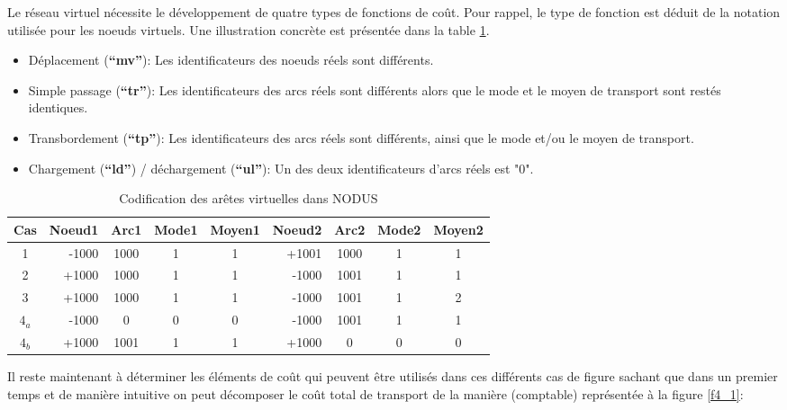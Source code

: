 Le réseau virtuel nécessite le développement de quatre types de fonctions de
coût. Pour rappel, le type de fonction est déduit de la notation utilisée pour
les noeuds virtuels. Une illustration concrète est présentée dans la table
\ref{tab4_1}.

\begin{itemize}
  \item Déplacement (\textbf{``mv''}): Les identificateurs des noeuds réels sont différents.

  \item Simple passage (\textbf{``tr''}): Les identificateurs des arcs réels sont
différents alors que le mode et le moyen de transport sont restés
identiques.

  \item Transbordement (\textbf{``tp''}): Les identificateurs des arcs réels sont
différents, ainsi que le mode et/ou le moyen de transport.

  \item Chargement (\textbf{``ld''}) / déchargement (\textbf{``ul''}): Un des deux identificateurs
d'arcs réels est "0".
\end{itemize}

\begin{table}[htbp]
\begin{center}
\begin{tabular}{crcccrccc}
\hline

Cas & Noeud1 & Arc1 & Mode1 & Moyen1 & Noeud2 & Arc2 & Mode2 & Moyen2\\
\hline
1 & -1000 & 1000 & 1 & 1 & +1001 & 1000 & 1 & 1\\

2 & +1000 & 1000 & 1 & 1 & -1000 & 1001 & 1 & 1\\

3 & +1000 & 1000 & 1 & 1 & -1000 & 1001 & 1 & 2\\

$4_a$ & -1000 & 0 & 0 & 0 & -1000 & 1001 & 1 & 1\\

$4_b$ & +1000 & 1001 & 1 & 1 & +1000 & 0 & 0 & 0\\
\hline
\end{tabular}
\caption{\label{tab4_1} Codification des ar\^etes virtuelles dans NODUS}
\end{center}
\end{table}

Il reste maintenant à déterminer les éléments de coût qui peuvent être utilisés
dans ces différents cas de figure sachant que dans un premier temps et de
manière intuitive on peut décomposer le coût total de transport de la manière
(comptable) représentée à la figure \ref{f4_1}:

